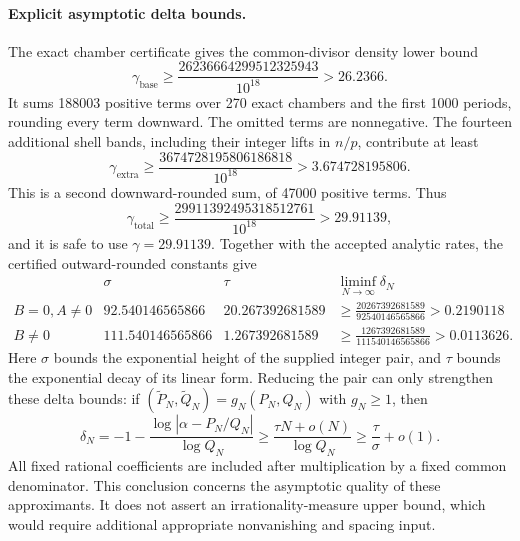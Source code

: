 \paragraph{Explicit asymptotic delta bounds.}
The exact chamber certificate gives the common-divisor density lower bound
\[
 \gamma_{\mathrm{base}}
 \ge\frac{26236664299512325943}{10^{18}}>26.2366.
\]
It sums 188003 positive terms over 270 exact chambers and the first 1000
periods, rounding every term downward. The omitted terms are nonnegative.
The fourteen additional shell bands, including their integer lifts in $n/p$,
contribute at least
\[
 \gamma_{\mathrm{extra}}
 \ge\frac{3674728195806186818}{10^{18}}>3.674728195806.
\]
This is a second downward-rounded sum, of 47000 positive terms. Thus
\[
 \gamma_{\mathrm{total}}
 \ge\frac{29911392495318512761}{10^{18}}>29.91139,
\]
and it is safe to use $\gamma=29.91139$.
Together with the accepted analytic rates, the certified outward-rounded
constants give
\[
\begin{array}{c|cc|c}
 &\sigma&\tau&\liminf_{N\to\infty}\delta_N\\\hline
 B=0, A\ne0
 &92.540146565866&20.267392681589
 &\displaystyle\ge\frac{20267392681589}{92540146565866}>0.2190118\\[3pt]
 B\ne0
 &111.540146565866&1.267392681589
 &\displaystyle\ge\frac{1267392681589}{111540146565866}>0.0113626.
\end{array}
\]
Here $\sigma$ bounds the exponential height of the supplied integer pair,
and $\tau$ bounds the exponential decay of its linear form.
Reducing the pair can only strengthen these delta bounds: if
$(\widetilde P_N,\widetilde Q_N)=g_N(P_N,Q_N)$ with $g_N\ge1$, then
\[
 \delta_N=-1-\frac{\log|\alpha-P_N/Q_N|}{\log Q_N}
 \ge\frac{\tau N+o(N)}{\log Q_N}
 \ge\frac\tau\sigma+o(1).
\]
All fixed rational coefficients are included after multiplication by a fixed
common denominator. This conclusion concerns the asymptotic quality of
these approximants. It does not assert an irrationality-measure upper bound,
which would require additional appropriate nonvanishing and spacing input.
